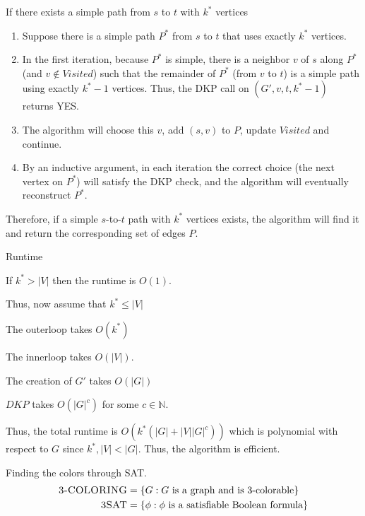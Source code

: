 \documentclass[12pt, letterpaper]{article}
\newcommand{\N}{\mathbb{N}}
\begin{document}
\begin{problemproof}
    If there exists a simple path from \(s\) to \(t\) with \(k^*\) vertices
    
    \begin{enumerate}
        \item Suppose there is a simple path \(P^*\) from \(s\) to \(t\) that uses exactly \(k^*\) vertices.  
        \item In the first iteration, because \(P^*\) is simple, there is a neighbor \(v\) of \(s\) along \(P^*\) (and \(v \notin Visited\)) such that the remainder of \(P^*\) (from \(v\) to \(t\)) is a simple path using exactly \(k^*-1\) vertices. Thus, the DKP call on \((G', v, t, k^*-1)\) returns YES.  
        \item The algorithm will choose this \(v\), add \((s,v)\) to \(P\), update \(Visited\) and continue.  
        \item By an inductive argument, in each iteration the correct choice (the next vertex on \(P^*\)) will satisfy the DKP check, and the algorithm will eventually reconstruct \(P^*\).
    \end{enumerate}
    
    Therefore, if a simple \(s\)-to-\(t\) path with \(k^*\) vertices exists, the algorithm will find it and return the corresponding set of edges \(P\).
    
    Runtime

    If $k^* > |V|$ then the runtime is $O(1)$.
    
    Thus, now assume that $k^* \leq |V|$

   The outerloop takes $O(k^*)$

   The innerloop takes $O(|V|)$.

   The creation of $G'$ takes $O(|G|)$

   $DKP$ takes $O(|G|^c)$ for some $c \in \N$.

   Thus, the total runtime is $O(k^*(|G|+|V||G|^c))$ which is polynomial with respect to $G$ since $k^*,|V| < |G|$. Thus, the algorithm is efficient.
\end{problemproof}
\newcommand{\SAT}{\textsc{3SAT}}
\newcommand{\TCOLOR}{\textsc{3-COLORING}}
\begin{problem}{Finding the colors through SAT.}
    \vspace{-20pt}
    \begin{align*}
        \TCOLOR &= \{G: \text{$G$ is a graph and is 3-colorable}\} \\
        \SAT &= \{\phi: \text{$\phi$ is a satisfiable Boolean formula}\}
    \end{align*}
\end{problem}
\end{document}
